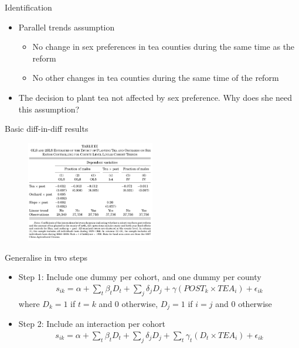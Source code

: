 \documentclass[11pt,notes=hide,aspectratio=169,mathserif]{beamer}
\begin{document}
\begin{frame}{Identification}
\begin{itemize}
\item Parallel trends assumption
\begin{itemize}
    \item No change in sex preferences in tea counties during the same time as the reform
    \item No other changes in tea counties during the same time of the reform
\end{itemize}
\item The decision to plant tea not affected by sex preference. Why
does she need this assumption?
\end{itemize}
\end{frame}

\begin{frame}{Basic diff-in-diff results}
\begin{figure}
\centering
\includegraphics[width=0.5\textwidth]{inputs/table3.png}
\end{figure}
\end{frame}

\begin{frame}{Generalise in two steps}
\begin{itemize}
\item Step 1: Include one dummy per cohort, and one dummy per county
\begin{align*}
s_{ik} = \alpha + \sum_t \beta_t D_t + \sum_j \delta_j D_j + \gamma (POST_k \times TEA_i) + \epsilon_{ik}
\end{align*}
where $D_k = 1$ if $t = k$ and $0$ otherwise, $D_j =1$ if $i = j$ and $0$ otherwise
\item Step 2:  Include an interaction per cohort
\begin{align*}
s_{ik} = \alpha + \sum_t \beta_t D_t + \sum_j \delta_j D_j + \sum_t \gamma_t (D_t \times TEA_i) + \epsilon_{ik}
\end{align*}
\end{itemize}
\end{frame}
\end{document}

